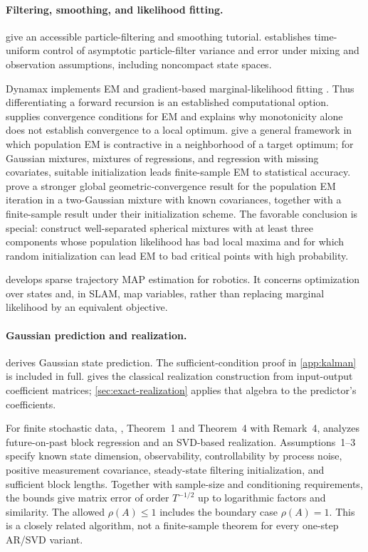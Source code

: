 \documentclass[11pt,twoside]{article}
\theoremstyle{definition}
\theoremstyle{remark}
\begin{document}
\paragraph{Filtering, smoothing, and likelihood fitting.}
\citet{doucet2009} give an accessible particle-filtering and smoothing
tutorial. \citet{douc2014} establishes time-uniform
control of asymptotic particle-filter variance and error under mixing
and observation assumptions, including noncompact state spaces.

Dynamax implements EM and gradient-based marginal-likelihood fitting
\citep{dynamax}. Thus differentiating a forward recursion is an established
computational option. \citet{wu1983} supplies convergence conditions for EM
and explains why monotonicity alone does not establish convergence to
a local optimum. \citet{balakrishnan2017} give a general framework in which
population EM is contractive in a neighborhood of a target optimum; for
Gaussian mixtures, mixtures of regressions, and regression with missing
covariates, suitable initialization leads finite-sample EM to statistical
accuracy. \citet{daskalakis2017} prove a stronger global geometric-convergence
result for the population EM iteration in a two-Gaussian mixture with known
covariances, together with a finite-sample result under their initialization
scheme. The favorable conclusion is special: \citet{jin2016} construct
well-separated spherical mixtures with at least three components whose
population likelihood has bad local maxima and for which random initialization
can lead EM to bad critical points with high probability.

\citet{dellaert2017} develops sparse trajectory MAP
estimation for robotics. It concerns optimization over states and, in
SLAM, map variables, rather than replacing marginal likelihood by an
equivalent objective.

\paragraph{Gaussian prediction and realization.}
\citet{mikusheva2009} derives Gaussian state prediction.
The sufficient-condition proof in \cref{app:kalman} is included in full.
\citet{hokalman1966} gives the classical realization construction from
input-output coefficient matrices; \cref{sec:exact-realization} applies
that algebra to the predictor's coefficients.

For finite stochastic data, \citet{tsiamis2019}, Theorem~1 and Theorem~4
with Remark~4, analyzes future-on-past block regression and an SVD-based
realization. Assumptions~1--3 specify known state dimension, observability,
controllability by process noise, positive measurement covariance,
steady-state filtering initialization, and sufficient block lengths.
Together with sample-size and conditioning requirements, the bounds give
matrix error of order \(T^{-1/2}\) up to logarithmic factors and similarity.
The allowed \(\rho(A)\le1\) includes the boundary case \(\rho(A)=1\).
This is a closely related algorithm, not a finite-sample theorem for
every one-step AR/SVD variant.
\end{document}
